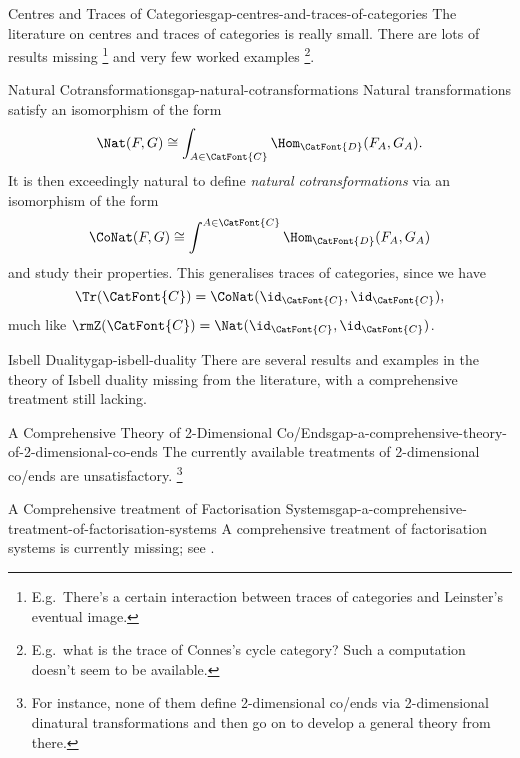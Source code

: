 \begin{gap}{Centres and Traces of Categories}{gap-centres-and-traces-of-categories}%
    The literature on centres and traces of categories is really small. There are lots of results missing%
    \footnote{%
        E.g.\ There's a certain interaction between traces of categories and Leinster's eventual image.
    } %
    and very few worked examples%
    \footnote{%
        E.g.\ what is the trace of Connes's cycle category? Such a computation doesn't seem to be available.
        \par\vspace*{\TCBBoxCorrection}
    }.%
\end{gap}
\begin{gap}{Natural Cotransformations}{gap-natural-cotransformations}%
    Natural transformations satisfy an isomorphism of the form
    \[
        \Nat(F,G)%
        \cong%
        \int_{A\in\CatFont{C}}\Hom_{\CatFont{D}}(F_{A},G_{A}).%
    \]%
    It is then exceedingly natural to define \textit{natural cotransformations} via an isomorphism of the form
    \[
        \CoNat(F,G)%
        \cong%
        \int^{A\in\CatFont{C}}\Hom_{\CatFont{D}}(F_{A},G_{A})%
    \]%
    and study their properties. This generalises traces of categories, since we have
    \[
        \Tr(\CatFont{C})%
        =%
        \CoNat(\id_{\CatFont{C}},\id_{\CatFont{C}}),
    \]%
    much like $\rmZ(\CatFont{C})=\Nat(\id_{\CatFont{C}},\id_{\CatFont{C}})$.
\end{gap}
\begin{gap}{Isbell Duality}{gap-isbell-duality}%
    There are several results and examples in the theory of Isbell duality missing from the literature, with a comprehensive treatment still lacking.
\end{gap}
\begin{gap}{A Comprehensive Theory of 2-Dimensional Co/Ends}{gap-a-comprehensive-theory-of-2-dimensional-co-ends}%
    The currently available treatments of 2-dimensional co/ends are unsatisfactory.%
    \footnote{%
        For instance, none of them define 2-dimensional co/ends via 2-dimensional dinatural transformations and then go on to develop a general theory from there.
        \par\vspace*{\TCBBoxCorrection}
    }%
\end{gap}
\begin{gap}{A Comprehensive treatment of Factorisation Systems}{gap-a-comprehensive-treatment-of-factorisation-systems}%
    A comprehensive treatment of factorisation systems is currently missing; see \cite{MO495003}.
\end{gap}
\begin{appendices}

\end{appendices}

